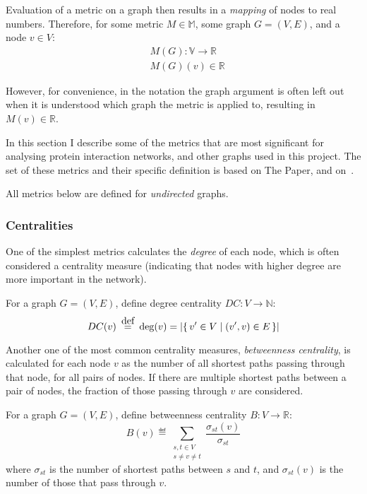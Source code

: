 Evaluation of a metric on a graph then results in a \textsl{mapping} of nodes to real numbers.
Therefore, for some metric $M \in \mathbb{M}$, some graph $G = (V, E)$, and a node $v \in V$:
\begin{align}
    &M(G) : \mathbb{V} \rightarrow \mathbb{R}\\
    &M(G)(v) \in \mathbb{R}
\end{align}

However, for convenience, in the notation the graph argument is often left out when it is understood which graph the metric is applied to, resulting in $M(v) \in \mathbb{R}$.

\parspace

In this section I describe some of the metrics that are most significant for analysing protein interaction networks, and other graphs used in this project.
The set of these metrics and their specific definition is based on The Paper\cite{Bozhilova2019}, and on~\cite{MartinHernandez2011}.

All metrics below are defined for \textsl{undirected} graphs.

\subsubsection{Centralities}

One of the simplest metrics calculates the \textsl{degree} of each node, which is often considered a centrality measure (indicating that nodes with higher degree are more important in the network).

\begin{definition}
    For a graph $G = (V, E)$, define degree centrality $DC : V \rightarrow \mathbb{N}$:
    \begin{equation*}
        DC(v) \eqdef \deg(v) = \left\lvert \Set{v' \in V}{(v', v) \in E} \right\rvert
    \end{equation*}
\end{definition}

Another one of the most common centrality measures, \textsl{betweenness centrality}, is calculated for each node $v$ as the number of all shortest paths passing through that node, for all pairs of nodes.
If there are multiple shortest paths between a pair of nodes, the fraction of those passing through $v$ are considered.

\begin{definition}
    For a graph $G = (V, E)$, define betweenness centrality $B : V \rightarrow \mathbb{R}$:
    \begin{equation*}
        B(v) \eqdef \sum_{\substack{s,t \in V \\ s \ne v \ne t}} \frac{ \sigma_{st}(v) }{ \sigma_{st} }
    \end{equation*}
    where $\sigma_{st}$ is the number of shortest paths between $s$ and $t$, and $\sigma_{st}(v)$ is the number of those that pass through $v$.
\end{definition}

